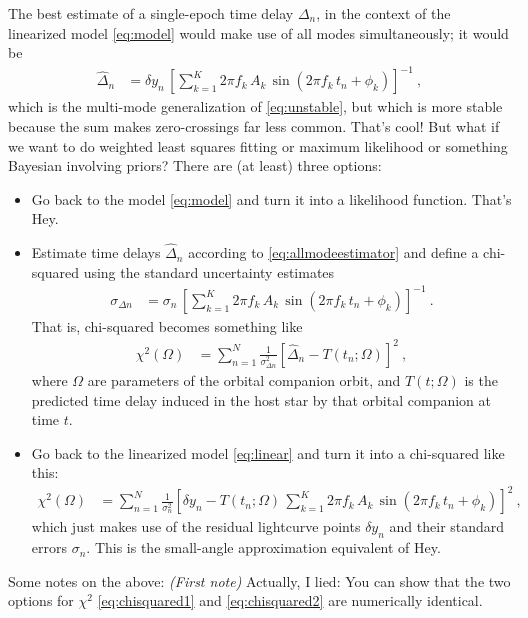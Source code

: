 \documentclass[12pt]{article}
\begin{document}
The best estimate of a single-epoch time delay $\Delta_n$, in the context of the linearized model \eqref{eq:model} would make use of all modes simultaneously; it would be
\begin{align}
    \hat\Delta_n &= \delta y_n\,\left[\sum_{k=1}^K 2\pi f_k\,A_k\,\sin(2\pi f_k\,t_n + \phi_k)\right]^{-1} ~,\label{eq:allmodeestimator}
\end{align}
which is the multi-mode generalization of \eqref{eq:unstable}, but which is more stable because the sum makes zero-crossings far less common.
That's cool!
But what if we want to do weighted least squares fitting or maximum likelihood or something Bayesian involving priors?
There are (at least) three options:
\begin{itemize}
    \item Go back to the model \eqref{eq:model} and turn it into a likelihood function. That's Hey.
    \item Estimate time delays $\hat\Delta_n$ according to \eqref{eq:allmodeestimator} and define a chi-squared using the standard uncertainty estimates
    \begin{align}
        \sigma_{\Delta n} &= \sigma_n\,\left[\sum_{k=1}^K 2\pi f_k\,A_k\,\sin(2\pi f_k\,t_n + \phi_k)\right]^{-1} ~.
    \end{align}
    That is, chi-squared becomes something like
    \begin{align}
        \chi^2(\Omega) &= \sum_{n=1}^N \frac{1}{\sigma_{\Delta n}^2}\left[\hat\Delta_n - T(t_n;\Omega)\right]^2 ~,\label{eq:chisquared1}
    \end{align}
    where $\Omega$ are parameters of the orbital companion orbit, and $T(t;\Omega)$ is the predicted time delay induced in the host star by that orbital companion at time $t$.
    \item Go back to the linearized model \eqref{eq:linear} and turn it into a chi-squared like this:
    \begin{align}
        \chi^2(\Omega) &= \sum_{n=1}^N \frac{1}{\sigma_n^2}\left[\delta y_n - T(t_n;\Omega)\, \sum_{k=1}^K 2\pi f_k\,A_k\,\sin(2\pi f_k\,t_n + \phi_k)\right]^2 ~,\label{eq:chisquared2}
    \end{align}
    which just makes use of the residual lightcurve points $\delta y_n$ and their standard errors $\sigma_n$.
    This is the small-angle approximation equivalent of Hey.
\end{itemize}
Some notes on the above:
\textsl{(First note)} Actually, I lied: You can show that the two options for $\chi^2$ \eqref{eq:chisquared1} and \eqref{eq:chisquared2} are numerically identical.
\end{document}
